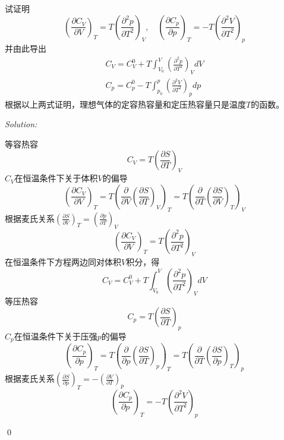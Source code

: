 \documentclass[12pt,a4paper]{article}
\newenvironment{problem}[2][Problem]{\begin{trivlist}
\item[\hskip \labelsep {\bfseries #1}\hskip \labelsep {\bfseries #2.}]}{\end{trivlist}}
\newenvironment{sol}
    {\emph{Solution:}
    }
    {
    \qed
    }
\begin{document}
\begin{problem}{2.9}
试证明
\[
\left(\frac{\partial C_V}{\partial V}\right)_T=T\left(\frac{\partial^2p}{\partial T^2}\right)_V,\quad\left(\frac{\partial C_p}{\partial p}\right)_T=-T\left(\frac{\partial^2V}{\partial T^2}\right)_p
\]
并由此导出
\begin{gather*}
C_V=C_V^0+T\int_{V_0}^V\left(\frac{\partial^2p}{\partial T^2}\right)_VdV\\
C_p=C_p^0-T\int_{p_0}^p\left(\frac{\partial^2V}{\partial T^2}\right)_pdp
\end{gather*}
根据以上两式证明，理想气体的定容热容量和定压热容量只是温度$T$的函数。
\end{problem}
\begin{sol}
等容热容
\begin{equation}
C_V=T\left(\frac{\partial S}{\partial T}\right)_V
\end{equation}
$C_V$在恒温条件下关于体积$V$的偏导
\begin{equation}
\left(\frac{\partial C_V}{\partial V}\right)_T=T\left(\frac{\partial}{\partial V}\left(\frac{\partial S}{\partial T}\right)_V\right)_T=T\left(\frac{\partial}{\partial T}\left(\frac{\partial S}{\partial V}\right)_T\right)_V
\end{equation}
根据麦氏关系$\left(\frac{\partial S}{\partial V}\right)_T=\left(\frac{\partial p}{\partial T}\right)_V$
\begin{equation}
\left(\frac{\partial C_V}{\partial V}\right)_T=T\left(\frac{\partial^2p}{\partial T^2}\right)_V
\end{equation}
在恒温条件下方程两边同对体积$V$积分，得
\begin{equation}
C_V=C_V^0+T\int_{V_0}^V\left(\frac{\partial^2p}{\partial T^2}\right)_VdV
\end{equation}
等压热容
\begin{equation}
C_p=T\left(\frac{\partial S}{\partial T}\right)_p
\end{equation}
$C_p$在恒温条件下关于压强$p$的偏导
\begin{equation}
\left(\frac{\partial C_p}{\partial p}\right)_T=T\left(\frac{\partial}{\partial p}\left(\frac{\partial S}{\partial T}\right)_p\right)_T=T\left(\frac{\partial}{\partial T}\left(\frac{\partial S}{\partial p}\right)_T\right)_p
\end{equation}
根据麦氏关系$\left(\frac{\partial S}{\partial p}\right)_T=-\left(\frac{\partial V}{\partial T}\right)_p$
\begin{equation}
\left(\frac{\partial C_p}{\partial p}\right)_T=-T\left(\frac{\partial^2V}{\partial T^2}\right)_p

\end{equation}
\end{sol}
\end{document}
